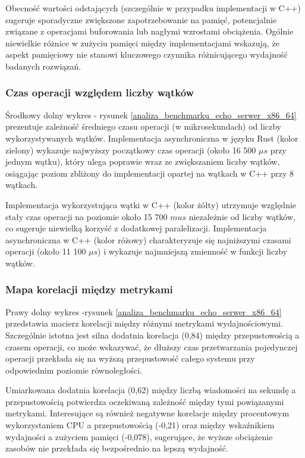 Obecność wartości odstających (szczególnie w przypadku implementacji w C++) sugeruje sporadyczne zwiększone zapotrzebowanie na pamięć, potencjalnie związane z operacjami buforowania lub nagłymi wzrostami obciążenia. Ogólnie niewielkie różnice w zużyciu pamięci między implementacjami wskazują, że aspekt pamięciowy nie stanowi kluczowego czynnika różnicującego wydajność badanych rozwiązań.

\subsubsection{Czas operacji względem liczby wątków}
Środkowy dolny wykres - rysunek \ref{analiza_benchmarku_echo_serwer_x86_64} prezentuje zależność średniego czasu operacji (w mikrosekundach) od liczby wykorzystywanych wątków. Implementacja asynchroniczna w języku Rust (kolor zielony) wykazuje najwyższy początkowy czas operacji (około 16 500 $\mu s$ przy jednym wątku), który ulega poprawie wraz ze zwiększaniem liczby wątków, osiągając poziom zbliżony do implementacji opartej na wątkach w C++ przy 8 wątkach.

Implementacja wykorzystująca wątki w C++ (kolor żółty) utrzymuje względnie stały czas operacji na poziomie około 15 700 $
mu s$ niezależnie od liczby wątków, co sugeruje niewielką korzyść z dodatkowej paralelizacji. Implementacja asynchroniczna w C++ (kolor różowy) charakteryzuje się najniższymi czasami operacji (około 11 100 $\mu s$) i wykazuje najmniejszą zmienność w funkcji liczby wątków.

\subsubsection{Mapa korelacji między metrykami}
Prawy dolny wykres -rysunek \ref{analiza_benchmarku_echo_serwer_x86_64} przedstawia macierz korelacji między różnymi metrykami wydajnościowymi. Szczególnie istotna jest silna dodatnia korelacja (0,84) między przepustowością a czasem operacji, co może wskazywać, że dłuższy czas przetwarzania pojedynczej operacji przekłada się na wyższą przepustowość całego systemu przy odpowiednim poziomie równoległości.

Umiarkowana dodatnia korelacja (0,62) między liczbą wiadomości na sekundę a przepustowością potwierdza oczekiwaną zależność między tymi powiązanymi metrykami. Interesujące są również negatywne korelacje między procentowym wykorzystaniem CPU a przepustowością (-0,21) oraz między wskaźnikiem wydajności a zużyciem pamięci (-0,078), sugerujące, że wyższe obciążenie zasobów nie przekłada się bezpośrednio na lepszą wydajność.

